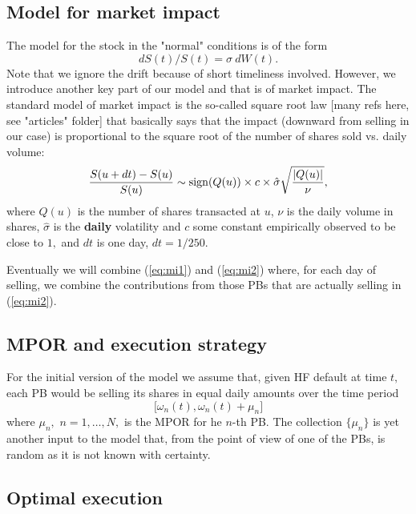 \documentclass{article}
\begin{document}
\subsection{Model for market impact}

The model for the stock in the "normal" conditions is of the form%
\begin{equation}
dS(t)/S(t)=\sigma ~dW(t).  \label{eq:mi1}
\end{equation}%
Note that we ignore the drift because of short timeliness involved. However,
we introduce another key part of our model and that is of market impact. The
standard model of market impact is the so-called square root law [many refs
here, see "articles" folder] that basically says that the impact (downward
from selling in our case) is proportional to the square root of the number
of shares sold vs. daily volume:%
\begin{equation}
\frac{S(u+dt)-S(u)}{S(u)}\sim \limfunc{sign}(Q(u))\times c\times \hat{\sigma}%
\sqrt{\frac{\left\vert Q(u)\right\vert }{\nu }},  \label{eq:mi2}
\end{equation}%
where $Q(u)$ is the number of shares transacted at $u$, $\nu $ is the daily
volume in shares, $\hat{\sigma}$ is the \textbf{daily} volatility and $c$
some constant empirically observed to be close to $1,$ and $dt$ is one day, $%
dt=1/250.$

Eventually we will combine (\ref{eq:mi1}) and (\ref{eq:mi2}) where, for each
day of selling, we combine the contributions from those PBs that are
actually selling in (\ref{eq:mi2}).

\subsection{MPOR and execution strategy}

For the initial version of the model we assume that, given HF default at
time $t,$ each PB would be selling its shares in equal daily amounts over
the time period 
\begin{equation*}
\lbrack \omega _{n}(t),\omega _{n}(t)+\mu _{n}]
\end{equation*}%
where $\mu _{n},$ $n=1,\dots ,N,$ is the MPOR for he $n$-th PB. The
collection $\{\mu _{n}\}$ is yet another input to the model that, from the
point of view of one of the PBs, is random as it is not known with certainty.

\subsection{Optimal execution}
\end{document}
